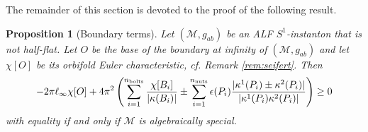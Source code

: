 \documentclass[a4paper,10pt,reqno]{amsart}
\newcommand{\nut}{P}
\newcommand{\bolt}{B}
\newcommand{\cM}{\mathcal{M}}
\theoremstyle{plain}
\newtheorem{prop}[thm]{Proposition}
\newcommand{\nnuts}{n_{\text{\rm nuts}}}
\newcommand{\nbolts}{n_{\text{\rm bolts}}}
\numberwithin{equation}{section}
\newcommand{\eps}{\epsilon}
\begin{document}
The remainder of this section is devoted to the proof of the following result.
\begin{prop}[Boundary terms] \label{prop:magbound} 
Let $(\cM, g_{ab})$ be an ALF $S^1$-instanton that is not half-flat. Let $O$ be the base of the boundary at infinity of $(\cM, g_{ab})$ and let $\chi[O]$ be its orbifold Euler characteristic, cf. Remark \ref{rem:seifert}.  Then
\begin{align}  \label{eq:magbound}
-2\pi \ell_\infty \chi[O]
+4\pi^2 \left(
\sum_{i=1}^{\nbolts} \frac{\chi[\bolt_i]}{|\kappa(\bolt_i)|}
\pm\sum_{i=1}^{\nnuts} \eps(\nut_i)
\frac{|\kappa^1(\nut_i) \pm \kappa^2(\nut_i)|}{|\kappa^1(\nut_i)\kappa^2(\nut_i)|}
\right)
\geq 0
\end{align}
with equality if and only if $\cM$ is algebraically special.
\end{prop} 
%
\end{document}
